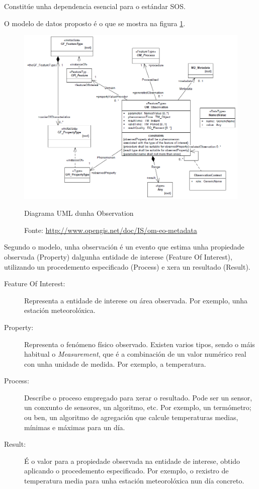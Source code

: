 Constitúe unha dependencia esencial para o estándar SOS.

O modelo de datos proposto é o que se mostra na figura \ref{fig:uml-om}.
\begin{figure}[hbtp]
  \centering
  \includegraphics[width=.85\textwidth]{images/uml-observations.png}
  \caption{Diagrama UML dunha Observation}
  \label{fig:uml-om}
  \caption*{Fonte: \url{http://www.opengis.net/doc/IS/om-eo-metadata}}
\end{figure}

Segundo o modelo, unha observación é un evento que estima unha propiedade observada (Property) dalgunha entidade de interese (Feature Of Interest), utilizando un procedemento especificado (Process) e xera un resultado (Result).

\begin{description}
\item[Feature Of Interest:] Representa a entidade de interese ou área observada. Por exemplo, unha estación meteorolóxica. 
\item[Property:] Representa o fenómeno físico observado. Existen varios tipos, sendo o máis habitual o \emph{Measurement}, que é a combinación de un valor numérico real con unha unidade de medida. Por exemplo, a temperatura.
\item[Process:] Describe o proceso empregado para xerar o resultado. Pode ser un sensor, un conxunto de sensores, un algoritmo, etc. Por exemplo, un termómetro; ou ben, un algoritmo de agregación que calcule temperaturas medias, mínimas e máximas para un día.
\item[Result:] É o valor para a propiedade observada na entidade de interese, obtido aplicando o procedemento especificado. Por exemplo, o rexistro de temperatura media para unha estación meteorolóxica nun día concreto.
\end{description}


